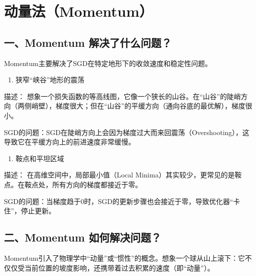 \setcounter{section}{1}

\hypertarget{ux52a8ux91cfux6cd5momentum}{%
\section{动量法（Momentum）}\label{ux52a8ux91cfux6cd5momentum}}

\hypertarget{ux4e00momentum-ux89e3ux51b3ux4e86ux4ec0ux4e48ux95eeux9898}{%
\subsection{一、Momentum 解决了什么问题？}\label{ux4e00momentum-ux89e3ux51b3ux4e86ux4ec0ux4e48ux95eeux9898}}

Momentum主要解决了SGD在特定地形下的收敛速度和稳定性问题。

\begin{enumerate}
\def\labelenumi{\arabic{enumi}.}
\tightlist
\item
  狭窄``峡谷''地形的震荡
\end{enumerate}

描述： 想象一个损失函数的等高线图，它像一个狭长的山谷。在``山谷''的陡峭方向（两侧峭壁），梯度很大；但在``山谷''的平缓方向（通向谷底的最优解），梯度很小。

SGD的问题：SGD在陡峭方向上会因为梯度过大而来回震荡（Overshooting），这导致它在平缓方向上的前进速度非常缓慢。

\begin{enumerate}
\def\labelenumi{\arabic{enumi}.}
\setcounter{enumi}{1}
\tightlist
\item
  鞍点和平坦区域
\end{enumerate}

描述： 在高维空间中，局部最小值（Local Minima）其实较少，更常见的是鞍点。在鞍点处，所有方向的梯度都接近于零。

SGD的问题：当梯度趋于0时，SGD的更新步骤也会接近于零，导致优化器``卡住''，停止更新。

\hypertarget{ux4e8cmomentum-ux5982ux4f55ux89e3ux51b3ux95eeux9898}{%
\subsection{二、Momentum 如何解决问题？}\label{ux4e8cmomentum-ux5982ux4f55ux89e3ux51b3ux95eeux9898}}

Momentum引入了物理学中``动量''或``惯性''的概念。想象一个球从山上滚下：它不仅仅受当前位置的坡度影响，还携带着过去积累的速度（即``动量''）。

